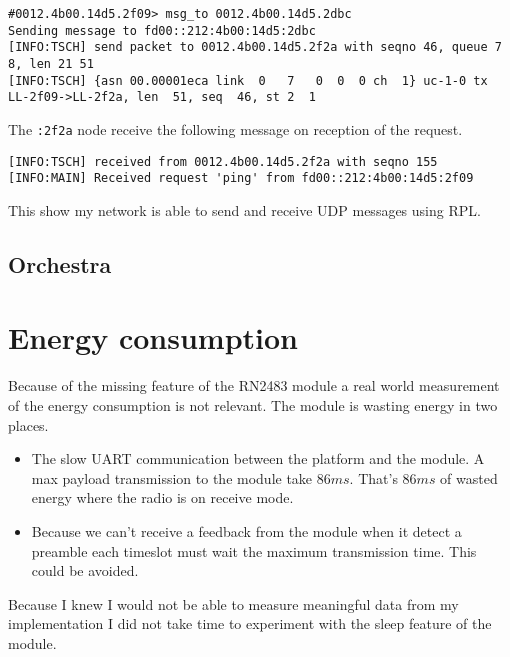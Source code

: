 \begin{lstlisting}[language=none]
#0012.4b00.14d5.2f09> msg_to 0012.4b00.14d5.2dbc
Sending message to fd00::212:4b00:14d5:2dbc
[INFO:TSCH] send packet to 0012.4b00.14d5.2f2a with seqno 46, queue 7 8, len 21 51
[INFO:TSCH] {asn 00.00001eca link  0   7   0  0  0 ch  1} uc-1-0 tx LL-2f09->LL-2f2a, len  51, seq  46, st 2  1
\end{lstlisting}

The \lstinline{:2f2a} node receive the following message on reception of the
request.

\begin{lstlisting}[language=none]
[INFO:TSCH] received from 0012.4b00.14d5.2f2a with seqno 155
[INFO:MAIN] Received request 'ping' from fd00::212:4b00:14d5:2f09
\end{lstlisting}

This show my network is able to send and receive UDP messages using RPL.

\subsection{Orchestra}

\section{Energy consumption\label{section:energyconsumption}}

Because of the missing feature of the RN2483 module a real world measurement of
the energy consumption is not relevant.
The module is wasting energy in two places.

\begin{itemize}
  \item The slow UART communication between the platform and the module. A max 
    payload transmission to the module take $86 ms$.  That's $86 ms$ of wasted 
    energy where the radio is on receive mode.
  \item Because we can't receive a feedback from the module when it detect a
    preamble each timeslot must wait the maximum transmission time. This could
    be avoided.
\end{itemize}

Because I knew I would not be able to measure meaningful data from my
implementation I did not take time to experiment with the sleep feature of the
module.
